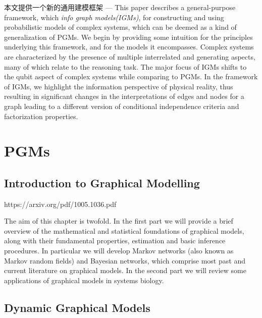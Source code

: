 \documentclass{article}
\theoremstyle{definition}
\theoremstyle{remark}
\theoremstyle{definition}
\begin{document}
\begin{CJK*}{UTF8}{gbsn}
本文提供一个新的通用建模框架 ---
This paper describes a general-purpose framework, which \emph{info graph models(IGMs)}, for constructing and using probabilistic models of complex systems, which can be deemed as a kind of generalization of PGMs. We begin by providing some intuition for the principles underlying this framework, and for the models it encompasses. Complex systems are characterized by the presence of multiple interrelated and generating aspects, many of which relate to the reasoning task. The major focus of IGMs shifts to the qubit aspect of complex systems while comparing to PGMs. In the framework of IGMs, we highlight the information perspective of physical reality, thus resulting in significant changes in the interpretations of edges and nodes for a graph leading to a different version of conditional independence criteria and factorization properties.


\section{PGMs}

\subsection{Introduction to Graphical Modelling}

https://arxiv.org/pdf/1005.1036.pdf

The aim of this chapter is twofold. In the first part we will provide a brief overview of the mathematical and statistical foundations of graphical models, along with their fundamental properties, estimation and basic inference procedures. In particular we will develop Markov networks (also known as Markov random fields) and Bayesian networks, which comprise most past and current literature on graphical models. In the second part we will review some applications of graphical models in systems biology.


\subsection{Dynamic Graphical Models}


\end{CJK*}
\end{document}
